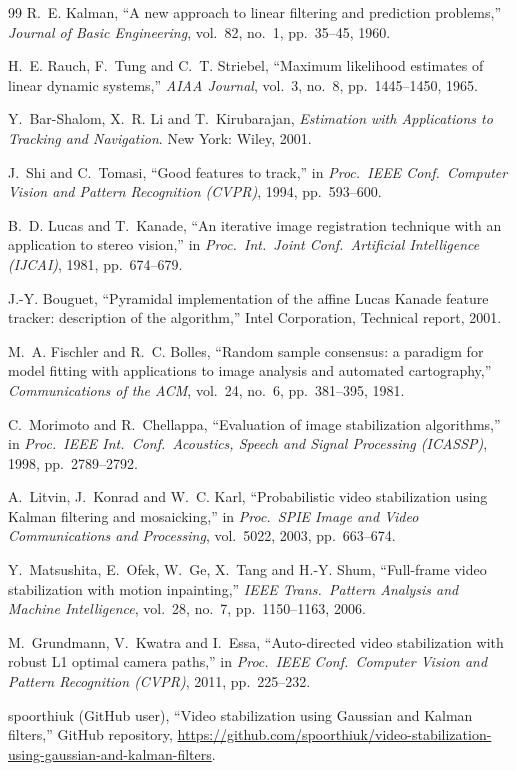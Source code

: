 \documentclass[11pt,a4paper]{article}
\begin{document}
\begin{thebibliography}{99}
R.~E. Kalman, ``A new approach to linear filtering and prediction problems,''
\emph{Journal of Basic Engineering}, vol.~82, no.~1, pp.~35--45, 1960.

H.~E. Rauch, F.~Tung and C.~T. Striebel, ``Maximum likelihood estimates of linear dynamic
systems,'' \emph{AIAA Journal}, vol.~3, no.~8, pp.~1445--1450, 1965.

Y.~Bar-Shalom, X.~R. Li and T.~Kirubarajan, \emph{Estimation with Applications to Tracking
and Navigation}. New York: Wiley, 2001.

J.~Shi and C.~Tomasi, ``Good features to track,'' in \emph{Proc.\ IEEE Conf.\ Computer Vision
and Pattern Recognition (CVPR)}, 1994, pp.~593--600.

B.~D. Lucas and T.~Kanade, ``An iterative image registration technique with an application to
stereo vision,'' in \emph{Proc.\ Int.\ Joint Conf.\ Artificial Intelligence (IJCAI)}, 1981,
pp.~674--679.

J.-Y. Bouguet, ``Pyramidal implementation of the affine Lucas Kanade feature tracker:
description of the algorithm,'' Intel Corporation, Technical report, 2001.

M.~A. Fischler and R.~C. Bolles, ``Random sample consensus: a paradigm for model fitting with
applications to image analysis and automated cartography,'' \emph{Communications of the ACM},
vol.~24, no.~6, pp.~381--395, 1981.

C.~Morimoto and R.~Chellappa, ``Evaluation of image stabilization algorithms,'' in
\emph{Proc.\ IEEE Int.\ Conf.\ Acoustics, Speech and Signal Processing (ICASSP)}, 1998,
pp.~2789--2792.

A.~Litvin, J.~Konrad and W.~C. Karl, ``Probabilistic video stabilization using Kalman filtering
and mosaicking,'' in \emph{Proc.\ SPIE Image and Video Communications and Processing},
vol.~5022, 2003, pp.~663--674.

Y.~Matsushita, E.~Ofek, W.~Ge, X.~Tang and H.-Y. Shum, ``Full-frame video stabilization with
motion inpainting,'' \emph{IEEE Trans.\ Pattern Analysis and Machine Intelligence}, vol.~28,
no.~7, pp.~1150--1163, 2006.

M.~Grundmann, V.~Kwatra and I.~Essa, ``Auto-directed video stabilization with robust L1 optimal
camera paths,'' in \emph{Proc.\ IEEE Conf.\ Computer Vision and Pattern Recognition (CVPR)},
2011, pp.~225--232.

spoorthiuk (GitHub user), ``Video stabilization using Gaussian and Kalman filters,'' GitHub repository,
\url{https://github.com/spoorthiuk/video-stabilization-using-gaussian-and-kalman-filters}.
\end{thebibliography}
\end{document}
